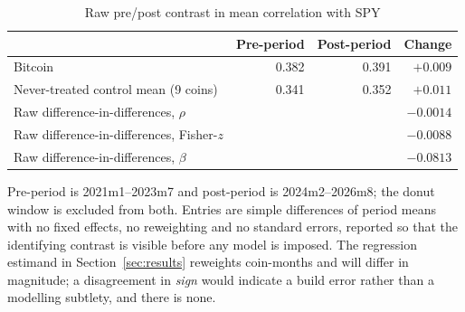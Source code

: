 \begin{table}[t]
\centering
\begin{threeparttable}
\caption{Raw pre/post contrast in mean correlation with SPY}
\label{tab:rawcontrast}
\begin{tabular}{lrrr}
\toprule
& Pre-period & Post-period & Change \\
\midrule
Bitcoin & 0.382 & 0.391 & $+0.009$ \\ %
Never-treated control mean (9 coins) & 0.341 & 0.352 & $+0.011$ \\ %
\midrule
Raw difference-in-differences, $\rho$ & \multicolumn{3}{r}{$-0.0014$} \\ %
Raw difference-in-differences, Fisher-$z$ & \multicolumn{3}{r}{$-0.0088$} \\ %
Raw difference-in-differences, $\beta$ & \multicolumn{3}{r}{$-0.0813$} \\ %
\bottomrule
\end{tabular}
\begin{tablenotes}[flushleft]
\footnotesize
\item Pre-period is 2021m1--2023m7 and post-period is 2024m2--2026m8; the donut window is excluded from both. Entries are simple differences of period means with no fixed effects, no reweighting and no standard errors, reported so that the identifying contrast is visible before any model is imposed. The regression estimand in Section~\ref{sec:results} reweights coin-months and will differ in magnitude; a disagreement in \emph{sign} would indicate a build error rather than a modelling subtlety, and there is none.
\end{tablenotes}
\end{threeparttable}
\end{table}
